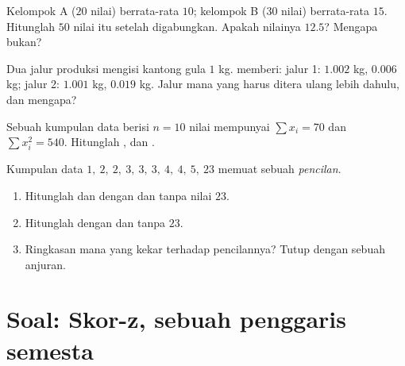 \begin{exercise}[$\star\star$]\label{exo:g11:stat:7}
Kelompok A ($20$ nilai) berrata-rata $10$; kelompok B ($30$ nilai) berrata-rata
$15$. Hitunglah  $50$ nilai itu setelah digabungkan. Apakah nilainya
 $12.5$? Mengapa bukan?
\end{exercise}

\begin{exercise}[$\star\star$]\label{exo:g11:stat:8}
Dua jalur produksi mengisi kantong gula $1$ kg.  memberi:
jalur 1:  $1.002$ kg,  $0.006$ kg; jalur 2: 
$1.001$ kg,  $0.019$ kg. Jalur mana yang harus ditera ulang lebih
dahulu, dan mengapa?
\end{exercise}

\begin{exercise}[$\star\star$]\label{exo:g11:stat:9}
Sebuah kumpulan data berisi $n = 10$ nilai mempunyai $\sum x_i = 70$ dan
$\sum x_i^2 = 540$. Hitunglah ,  dan .
\end{exercise}

\begin{exercise}[$\star\star\star$]\label{exo:g11:stat:10}
Kumpulan data $1,\ 2,\ 2,\ 3,\ 3,\ 3,\ 4,\ 4,\ 5,\ 23$ memuat sebuah
\emph{pencilan}.
\begin{enumerate}
  \item Hitunglah  dan  dengan dan tanpa nilai $23$.
  \item Hitunglah  dengan dan tanpa $23$.
  \item Ringkasan mana yang kekar terhadap pencilannya? Tutup dengan sebuah
        anjuran.
\end{enumerate}
\end{exercise}

\section{Soal: Skor-z, sebuah penggaris semesta}

